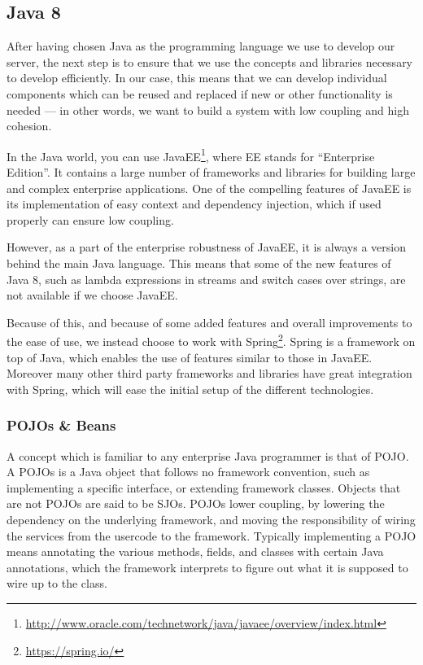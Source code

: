 \subsection{Java 8}
After having chosen Java as the programming language we use to develop our server, the next step is to ensure that we use the concepts and libraries necessary to develop efficiently.
In our case, this means that we can develop individual components which can be reused and replaced if new or other functionality is needed --- in other words, we want to build a system with low coupling and high cohesion.

In the Java world, you can use JavaEE\footnote{\url{http://www.oracle.com/technetwork/java/javaee/overview/index.html}}, where EE stands for ``Enterprise Edition''.
It contains a large number of frameworks and libraries for building large and complex enterprise applications.
One of the compelling features of JavaEE is its implementation of easy context and dependency injection, which if used properly can ensure low coupling.

However, as a part of the enterprise robustness of JavaEE, it is always a version behind the main Java language.
This means that some of the new features of Java 8, such as lambda expressions in streams and switch cases over strings, are not available if we choose JavaEE.

Because of this, and because of some added features and overall improvements to the ease of use, we instead choose to work with Spring\footnote{\url{https://spring.io/}}.
Spring is a framework on top of Java, which enables the use of features similar to those in JavaEE.
Moreover many other third party frameworks and libraries have great integration with Spring, which will ease the initial setup of the different technologies.

\subsubsection{POJOs \& Beans}
A concept which is familiar to any enterprise Java programmer is that of \ac{POJO}.
A \acp{POJO} is a Java object that follows no framework convention, such as implementing a specific interface, or extending framework classes.
Objects that are not \acp{POJO} are said to be \acp{SJO}.
\acp{POJO} lower coupling, by lowering the dependency on the underlying framework, and moving the responsibility of wiring the services from the usercode to the framework.
Typically implementing a \ac{POJO} means annotating the various methods, fields, and classes with certain Java annotations, which the framework interprets to figure out what it is supposed to wire up to the class.\cite{spring_pojo}

